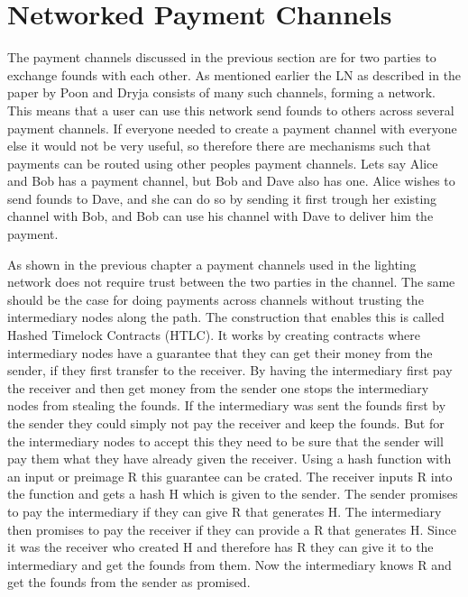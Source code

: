 \section{Networked Payment Channels}

The payment channels discussed in the previous section are for two parties to exchange founds with each other.
As mentioned earlier the LN as described in the paper by Poon and Dryja \cite{poon2015bitcoin} consists of many such channels, forming a network. This means that a user can use this network send founds to others across several payment channels. If everyone needed to create a payment channel with everyone else it would not be very useful, so therefore there are mechanisms such that payments can be routed using other peoples payment channels. Lets say Alice and Bob has a payment channel, but Bob and Dave also has one. Alice wishes to send founds to Dave, and she can do so by sending it first trough her existing channel with Bob, and Bob can use his channel with Dave to deliver him the payment.

As shown in the previous chapter a payment channels used in the lighting network does not require trust between the two parties in the channel. The same should be the case for doing payments across channels without trusting the intermediary nodes along the path. The construction that enables this is called Hashed Timelock Contracts (HTLC).
It works by creating contracts where intermediary nodes have a guarantee that they can get their money from the sender, if they first transfer to the receiver. By having the intermediary first pay the receiver and then get money from the sender one stops the intermediary nodes from stealing the founds. If the intermediary was sent the founds first by the sender they could simply not pay the receiver and keep the founds. But for the intermediary nodes to accept this they need to be sure that the sender will pay them what they have already given the receiver. Using a hash function with an input or preimage R this guarantee can be crated. The receiver inputs R into the function and gets a hash H which is given to the sender. The sender promises to pay the intermediary if they can give R that generates H. The intermediary then promises to pay the receiver if they can provide a R that generates H. Since it was the receiver who created H and therefore has R they can give it to the intermediary and get the founds from them. Now the intermediary knows R and get the founds from the sender as promised.

